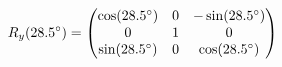 \documentclass[preview]{standalone}
\begin{document}
\begin{align*}
\special{dvisvgm:raw <g id='unique000'>}R_y(28.5^\circ) = \begin{pmatrix} \cos(28.5^\circ) & 0 & -\sin(28.5^\circ) \\ 0 & 1 & 0 \\ \sin(28.5^\circ) & 0 & \cos(28.5^\circ) \end{pmatrix}\special{dvisvgm:raw </g>}
\end{align*}
\end{document}
